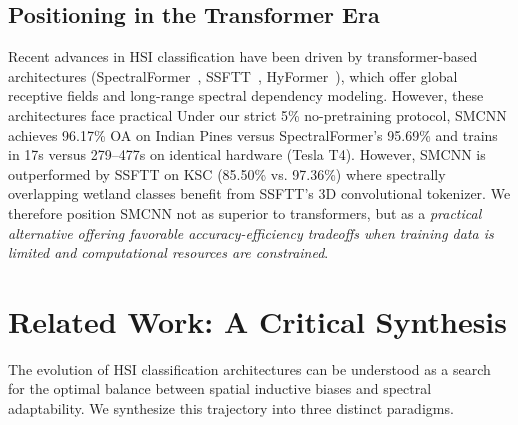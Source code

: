\documentclass[conference]{IEEEtran}
\begin{document}
{\begin{table}[!t]
\caption{Pipeline Components and Their Roles}
\label{tab:components}
\centering
{}
\end{table}

\subsection{Positioning in the Transformer Era}

Recent advances in HSI classification have been driven by transformer-based architectures (SpectralFormer~\cite{hong2022spectralformer}, SSFTT~\cite{sun2022ssftt}, HyFormer~\cite{li2023hyformer}), which offer global receptive fields and long-range spectral dependency modeling. However, these architectures face practical 
Under our strict 5\% no-pretraining protocol, SMCNN achieves 96.17\% OA on Indian Pines versus SpectralFormer's 95.69\% and trains in 17s versus 279--477s on identical hardware (Tesla T4). However, SMCNN is outperformed by SSFTT on KSC (85.50\% vs. 97.36\%) where spectrally overlapping wetland classes benefit from SSFTT's 3D convolutional tokenizer. We therefore position SMCNN not as superior to transformers, but as a \textit{practical alternative offering favorable accuracy-efficiency tradeoffs when training data is limited and computational resources are constrained}.

\section{Related Work: A Critical Synthesis}

The evolution of HSI classification architectures can be understood as a search for the optimal balance between spatial inductive biases and spectral adaptability. We synthesize this trajectory into three distinct paradigms.

}
\end{document}
